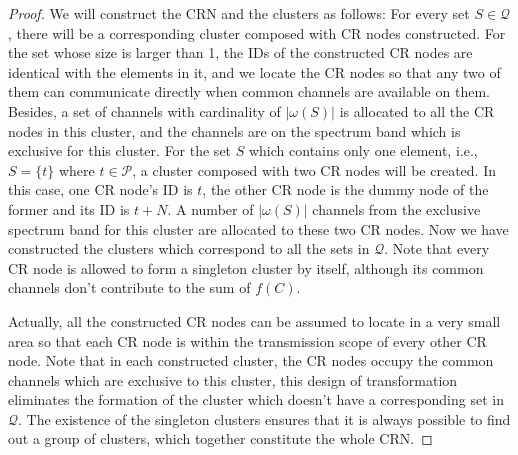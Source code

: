 \documentclass[times]{ettauth}
\newcommand{\ie}{i.e., }
\theoremstyle{mytheoremstyle}
\theoremstyle{mytheoremstyle}
\theoremstyle{mytheoremstyle}
\begin{document}
\begin{proof}
We will construct the CRN and the clusters as follows:
For every set $S\in \mathcal{Q}$, there will be a corresponding cluster composed with CR nodes constructed.
For the set whose size is larger than 1, the IDs of the constructed CR nodes are identical with the elements in it, and we locate the CR nodes so that any two of them can communicate directly when common channels are available on them.
Besides, a set of channels with cardinality of $|\omega(S)|$ is allocated to all the CR nodes in this cluster, and the channels are on the spectrum band which is exclusive for this cluster.
For the set $S$ which contains only one element, \ie $S =\{t\}$ where $t\in\mathcal{P}$, a cluster composed with two CR nodes will be created.
In this case, one CR node's ID is $t$, the other CR node is the dummy node of the former and its ID is $t+N$.
A number of $|\omega(S)|$ channels from the exclusive spectrum band for this cluster are allocated to these two CR nodes.
Now we have constructed the clusters which correspond to all the sets in $\mathcal{Q}$.
Note that every CR node is allowed to form a singleton cluster by itself, although its common channels don't contribute to the sum of $f(C)$.

Actually, all the constructed CR nodes can be assumed to locate in a very small area so that each CR node is within the transmission scope of every other CR node.
Note that in each constructed cluster, the CR nodes occupy the common channels which are exclusive to this cluster, this design of transformation eliminates the formation of the cluster which doesn't have a corresponding set in $\mathcal{Q}$.
The existence of the singleton clusters ensures that it is always possible to find out a group of clusters, which together constitute the whole CRN.


\end{proof}
\end{document}

